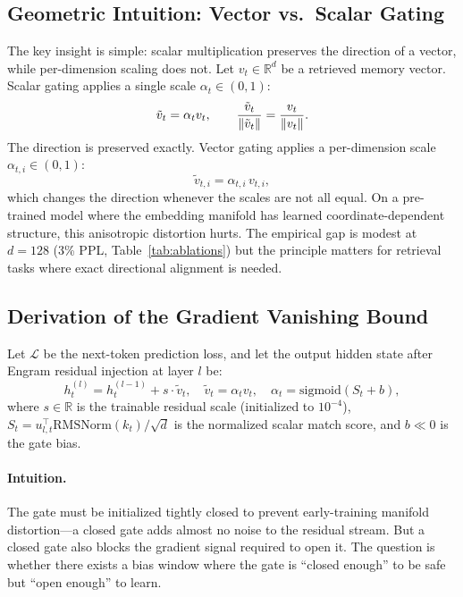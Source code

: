 \documentclass[preprint,12pt]{elsarticle}
\newcommand{\RMS}{\mathrm{RMSNorm}}
\newcommand{\sigmoid}{\mathrm{sigmoid}}
\DeclarePairedDelimiter{\norm}{\lVert}{\rVert}
\begin{document}
\subsection{Geometric Intuition: Vector vs.\ Scalar Gating}

The key insight is simple: scalar multiplication preserves the direction of a vector, while per-dimension scaling does not. Let $v_t \in \mathbb{R}^d$ be a retrieved memory vector. Scalar gating applies a single scale $\alpha_t \in (0,1)$:
\[
\tilde{v}_t = \alpha_t v_t, \qquad \frac{\tilde{v}_t}{\norm{\tilde{v}_t}} = \frac{v_t}{\norm{v_t}}.
\]
The direction is preserved exactly. Vector gating applies a per-dimension scale $\alpha_{t,i} \in (0,1)$:
\[
\tilde{v}_{t,i} = \alpha_{t,i}\, v_{t,i},
\]
which changes the direction whenever the scales are not all equal. On a pre-trained model where the embedding manifold has learned coordinate-dependent structure, this anisotropic distortion hurts. The empirical gap is modest at $d=128$ (3\% PPL, Table~\ref{tab:ablations}) but the principle matters for retrieval tasks where exact directional alignment is needed.

\subsection{Derivation of the Gradient Vanishing Bound}

Let $\mathcal{L}$ be the next-token prediction loss, and let the output hidden state after Engram residual injection at layer $l$ be:
\begin{equation}
h_t^{(l)} = h_t^{(l-1)} + s \cdot \tilde{v}_t, \quad \tilde{v}_t = \alpha_t v_t, \quad \alpha_t = \sigmoid(S_t + b),
\end{equation}
where $s \in \mathbb{R}$ is the trainable residual scale (initialized to $10^{-4}$), $S_t = u_{l,t}^\top \RMS(k_t) / \sqrt{d}$ is the normalized scalar match score, and $b \ll 0$ is the gate bias.

\paragraph{Intuition.} The gate must be initialized tightly closed to prevent early-training manifold distortion---a closed gate adds almost no noise to the residual stream. But a closed gate also blocks the gradient signal required to open it. The question is whether there exists a bias window where the gate is ``closed enough'' to be safe but ``open enough'' to learn.
\end{document}
